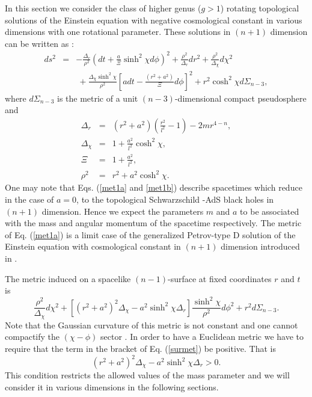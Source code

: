 \documentclass[a4paper,12pt,onecolumn]{revtex4}
\begin{document}
In this section we consider the class of higher genus ($g>1$)
rotating topological solutions of the Einstein equation with
negative cosmological constant in various dimensions with one
rotational parameter. These solutions in $(n+1)$ dimension can be
written as \cite{Kl97,Kl98}:
\begin{eqnarray}
ds^2 &=&-\frac{\Delta _r}{\rho ^2}(dt+\frac a\Xi \sinh ^2\chi d\phi )^2+%
\frac{\rho ^2}{\Delta _r}dr^2+\frac{\rho ^2}{\Delta _\chi }d\chi ^2
\nonumber \\
&&\ +\frac{\Delta _\chi \sinh ^2\chi }{\rho ^2}[a
dt-\frac{(r^2+a^2)}\Xi d\phi ]^2+r^2\cosh ^2\chi d\Sigma _{n-3},
\label{met1a}
\end{eqnarray}
where $d\Sigma _{n-3}$ is the metric of a unit $(n-3)$-dimensional compact
pseudosphere and
\begin{eqnarray}
\Delta _r &=&(r^2+a^2)(\frac{r^2}{l^2}-1)-2mr^{4-n},  \nonumber \\
\Delta _\chi &=&1+\frac{a^2}{l^2}\cosh ^2\chi ,  \nonumber \\
\Xi &=&1+\frac{a^2}{l^2},  \nonumber \\
\rho ^2 &=&r^2+a^2\cosh ^2\chi .  \label{met1b}
\end{eqnarray}
One may note that Eqs. (\ref{met1a} and \ref{met1b}) describe
spacetimes which reduce in the case of $a=0$, to the topological
Schwarzschild -AdS black holes in $(n+1)$ dimension. Hence we
expect the parameters $m$ and $a$ to be associated with the mass
and angular momentum of the spacetime respectively. The metric of
Eq. (\ref{met1a}) is a limit case of the generalized Petrov-type D
solution of the Einstein equation with cosmological constant in
$(n+1)$ dimension introduced in \cite{Kl98}.

The metric induced on a spacelike $(n-1)$-surface at fixed
coordinates $r$ and $t$ is
\begin{equation}
\frac{\rho ^2}{\Delta _\chi }d\chi ^2+[(r^2+a^2)^2\Delta _\chi -a^2\sinh
^2\chi \Delta _r]\frac{\sinh ^2\chi }{\rho ^2}d\phi ^2+r^2d\Sigma _{n-3}.
\label{surmet}
\end{equation}
Note that the Gaussian curvature of this metric is not constant
and one cannot compactify the $(\chi -\phi )$ sector \cite{Kl98}.
In order to have a Euclidean metric we have to require that the
term in the bracket of Eq. (\ref {surmet}) be positive. That is
\begin{equation}
(r^2+a^2)^2\Delta _\chi -a^2\sinh ^2\chi \Delta _r>0.  \label{Eucond}
\end{equation}
This condition restricts the allowed values of the mass parameter
and we will consider it in various dimensions in the following
sections.
\end{document}
